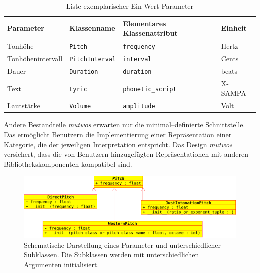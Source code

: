 \documentclass[12pt,a4paper,ngerman]{article}
\begin{document}
\begin{table}[h!]
    \begin{center}
        \begin{tabular}{l l l l} 
            \hline
            Parameter & Klassenname & Elementares Klassenattribut & Einheit \\ [0.5ex] 
            \hline\hline
            Tonhöhe & \texttt{Pitch} & \texttt{frequency} & Hertz \\ 
            Tonhöhenintervall & \texttt{PitchInterval} & \texttt{interval} & Cents \\ 
            Dauer & \texttt{Duration} & \texttt{duration} & beats \\ 
            Text & \texttt{Lyric} & \texttt{phonetic\_script} & X-SAMPA\footnotemark \\ 
            Lautstärke & \texttt{Volume} & \texttt{amplitude} & Volt \\ [1ex] 
            \hline
        \end{tabular}
    \end{center}

    \caption{Liste exemplarischer Ein-Wert-Parameter}
\end{table}


Andere Bestandteile \emph{mutwos} erwarten nur die minimal--definierte Schnittstelle.
Das ermöglicht Benutzern die Implementierung einer Repräsentation einer Kategorie, die der jeweiligen Interpretation entspricht.
Das Design \emph{mutwos} versichert, dass die von Benutzern hinzugefügten Repräsentationen mit anderen Bibliothekskomponenten kompatibel sind.

\begin{figure}[h!]
    \includegraphics[scale=0.4]{uml_diagrams/pitches.png}

    \caption{%
        Schematische Darstellung eines Parameter und unterschiedlicher Subklassen.
        Die Subklassen werden mit unterschiedlichen Argumenten initialisiert.
    }

\end{figure}
\end{document}
